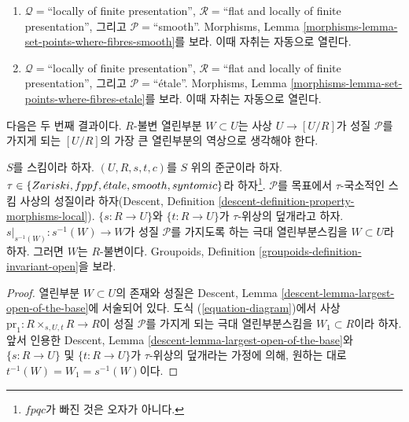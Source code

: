 \begin{remark}
\begin{enumerate}
이때 자취는 자동으로 열린다.
\item[(7)] $\mathcal{Q} =$``locally of finite presentation'',
$\mathcal{R} =$``flat and locally of finite presentation'', 그리고
$\mathcal{P}=$``smooth''. Morphisms, Lemma
\ref{morphisms-lemma-set-points-where-fibres-smooth}를 보라.
이때 자취는 자동으로 열린다.
\item[(8)] $\mathcal{Q} =$``locally of finite presentation'',
$\mathcal{R} =$``flat and locally of finite presentation'', 그리고
$\mathcal{P}=$``\'etale''. Morphisms, Lemma
\ref{morphisms-lemma-set-points-where-fibres-etale}를 보라.
이때 자취는 자동으로 열린다.
\end{enumerate}
\end{remark}

\noindent
다음은 두 번째 결과이다. $R$-불변 열린부분 $W \subset U$는
사상 $U \to [U/R]$가 성질 $\mathcal{P}$를 가지게 되는 $[U/R]$의
가장 큰 열린부분의 역상으로 생각해야 한다.

\begin{lemma}
\label{lemma-property-invariant}
$S$를 스킴이라 하자.
$(U, R, s, t, c)$를 $S$ 위의 준군이라 하자.
$\tau \in \{Zariski, \linebreak[0] fppf,
\linebreak[0] \etale, \linebreak[0]
smooth, \linebreak[0] syntomic\}$라 하자\footnote{$fpqc$가 빠진 것은
오자가 아니다.}. $\mathcal{P}$를 목표에서 $\tau$-국소적인 스킴 사상의
성질이라 하자(Descent, Definition
\ref{descent-definition-property-morphisms-local}).
$\{s : R \to U\}$와 $\{t : R \to U\}$가 $\tau$-위상의 덮개라고 하자.
$s|_{s^{-1}(W)} : s^{-1}(W) \to W$가 성질 $\mathcal{P}$를 가지도록 하는
극대 열린부분스킴을 $W \subset U$라 하자. 그러면 $W$는 $R$-불변이다.
Groupoids, Definition \ref{groupoids-definition-invariant-open}을 보라.
\end{lemma}

\begin{proof}
열린부분 $W \subset U$의 존재와 성질은 Descent, Lemma
\ref{descent-lemma-largest-open-of-the-base}에 서술되어 있다.
도식 (\ref{equation-diagram})에서 사상
$\text{pr}_1 : R \times_{s, U, t} R \to R$이 성질 $\mathcal{P}$를
가지게 되는 극대 열린부분스킴을 $W_1 \subset R$이라 하자.
앞서 인용한 Descent, Lemma
\ref{descent-lemma-largest-open-of-the-base}와
$\{s : R \to U\}$ 및 $\{t : R \to U\}$가 $\tau$-위상의 덮개라는
가정에 의해, 원하는 대로 $t^{-1}(W) = W_1 = s^{-1}(W)$이다.
\end{proof}

